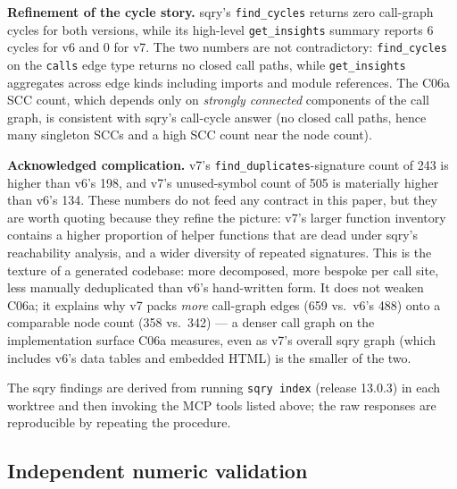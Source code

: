 \documentclass[11pt,letterpaper]{article}
\begin{document}
\textbf{Refinement of the cycle story.} sqry's \texttt{find\_cycles}
returns zero call-graph cycles for both versions, while its
high-level \texttt{get\_insights} summary reports 6 cycles for v6 and
0 for v7. The two numbers are not contradictory: \texttt{find\_cycles}
on the \texttt{calls} edge type returns no closed call paths, while
\texttt{get\_insights} aggregates across edge kinds including imports
and module references. The C06a SCC count, which depends only on
\emph{strongly connected} components of the call graph, is
consistent with sqry's call-cycle answer (no closed call paths,
hence many singleton SCCs and a high SCC count near the node count).

\textbf{Acknowledged complication.} v7's
\texttt{find\_duplicates}-signature count of 243 is higher than v6's
198, and v7's unused-symbol count of 505 is materially higher than
v6's 134. These numbers do not feed any contract in this paper, but
they are worth quoting because they refine the picture: v7's larger
function inventory contains a higher proportion of helper functions
that are dead under sqry's reachability analysis, and a wider
diversity of repeated signatures. This is the texture of a generated
codebase: more decomposed, more bespoke per call site, less manually
deduplicated than v6's hand-written form. It does not weaken C06a;
it explains why v7 packs \emph{more} call-graph edges
(659 vs.\ v6's 488) onto a comparable node count (358 vs.\ 342)
--- a denser call graph on the implementation surface C06a
measures, even as v7's overall sqry graph (which includes v6's
data tables and embedded HTML) is the smaller of the two.

The sqry findings are derived from running
\texttt{sqry index} (release 13.0.3) in each worktree and then
invoking the MCP tools listed above; the raw responses are
reproducible by repeating the procedure.

\subsection{Independent numeric validation}
\label{sec:numeric-validation}
\end{document}
